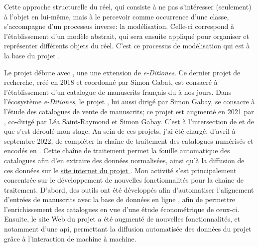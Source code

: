 Cette approche structurelle du réel, qui consiste à ne pas s'intéresser (seulement) à l'objet en lui-même, mais à le percevoir comme occurrence d'une classe, s'accompagne d'un processus inverse: la modélisation. Celle-ci correspond à l'établissement d'un modèle abstrait, qui sera ensuite appliqué pour organiser et représenter différents objets du réel. C'est ce processus de modélisation qui est à la base du projet \mssktb{}. 

Le projet débute avec \ktb{}, une une extension de \textit{e-Ditiones}. Ce dernier projet de recherche, créé en 2018 et coordonné par Simon Gabat, est consacré à l'établissement d'un catalogue de manuscrits français du  à nos jours. Dans l'écosystème \textit{e-Ditiones}, le projet \ktb{}, lui aussi dirigé par Simon Gabay, se consacre à l'étude des catalogues de vente de manuscrits; ce projet est augmenté en 2021 par \mss{}, co-dirigé par Léa Saint-Raymond et Simon Gabay. C'est à l'intersection de \mss{} et de \ktb{} que s'est déroulé mon stage. Au sein de ces projets, j'ai été chargé, d'avril à septembre 2022, de compléter la chaîne de traitement des catalogues numérisés et encodés en \xmltei{}. Cette chaîne de traitement permet la fouille automatique des catalogues afin d'en extraire des données normalisées, ainsi qu'à la diffusion de ces données sur le \href{https://katabase.huma-num.fr/}{site internet du projet \ktb{}}. Mon activité s'est principalement concentrée sur le développement de nouvelles fonctionnalités pour la chaîne de traitement. D'abord, des outils ont été développés afin d'automatiser l'alignement d'entrées de manuscrits avec la base de données en ligne \wkd{}, afin de permettre l'enrichissement des catalogues en vue d'une étude économétrique de ceux-ci. Ensuite, le site Web du projet a été augmenté de nouvelles fonctionnalités, et notamment d'une \gls{api}, permettant la diffusion automatisée des données du projet grâce à l'interaction de machine à machine.

